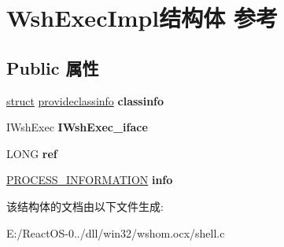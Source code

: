 \hypertarget{struct_wsh_exec_impl}{}\section{Wsh\+Exec\+Impl结构体 参考}
\label{struct_wsh_exec_impl}
\subsection*{Public 属性}
\begin{DoxyCompactItemize}
\item 
\mbox{\label{struct_wsh_exec_impl_ad652cd3b40453c78018a7c8681f65978}} 
\hyperlink{interfacestruct}{struct} \hyperlink{structprovideclassinfo}{provideclassinfo} {\bfseries classinfo}
\item 
\mbox{\label{struct_wsh_exec_impl_ab647fad78fdab79eb31cc8ca01f89275}} 
I\+Wsh\+Exec {\bfseries I\+Wsh\+Exec\+\_\+iface}
\item 
\mbox{\label{struct_wsh_exec_impl_afed041a956df8111fd9bd2be73234c4c}} 
L\+O\+NG {\bfseries ref}
\item 
\mbox{\label{struct_wsh_exec_impl_ac9c89c0edc9de0d73b0360526fda07f6}} 
\hyperlink{struct___p_r_o_c_e_s_s___i_n_f_o_r_m_a_t_i_o_n}{P\+R\+O\+C\+E\+S\+S\+\_\+\+I\+N\+F\+O\+R\+M\+A\+T\+I\+ON} {\bfseries info}
\end{DoxyCompactItemize}


该结构体的文档由以下文件生成\+:\begin{DoxyCompactItemize}
\item 
E\+:/\+React\+O\+S-\/0../dll/win32/wshom.\+ocx/shell.\+c\end{DoxyCompactItemize}
